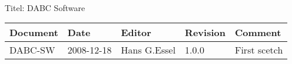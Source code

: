 \\Titel: DABC Software
\begin{table}[h]
\begin{tabular}{|p{2.8cm}|p{2.0cm}|p{3.0cm}|p{1.6cm}|p{5.0cm}|} \hline
Document   & Date        & Editor       & Revision & Comment \\
\hline DABC-SW & 2008-12-18 & Hans G.Essel & 1.0.0    & First
scetch \\ \hline
\end{tabular}
\end{table}
